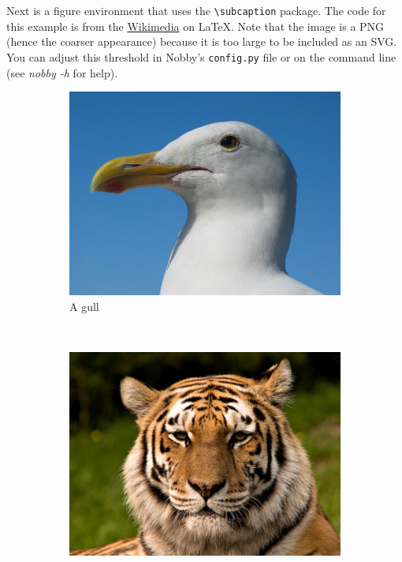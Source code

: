 \documentclass[10pt]{article}
\begin{document}
Next is a figure environment that uses the \texttt{\textbackslash{subcaption}}
package. The code for this example is from the
\href{http://en.wikibooks.org/wiki/LaTeX/Floats,_Figures_and_Captions}{Wikimedia}
on \LaTeX. Note that the image is a PNG (hence the coarser appearance)
because it is too large to be included as an SVG. You can adjust this threshold
in Nobby's \texttt{config.py} file or on the command line (see \emph{nobby -h}
for help).\\
\begin{figure}
  \centering
  \begin{subfigure}[b]{0.3\textwidth}
    \includegraphics[width=\textwidth]{gull}
    \caption{A gull}
    \label{fig:gull}
  \end{subfigure}%
  ~ %
  \begin{subfigure}[b]{0.3\textwidth}
    \includegraphics[width=\textwidth]{tiger}

\end{subfigure}
\end{figure}
\end{document}
